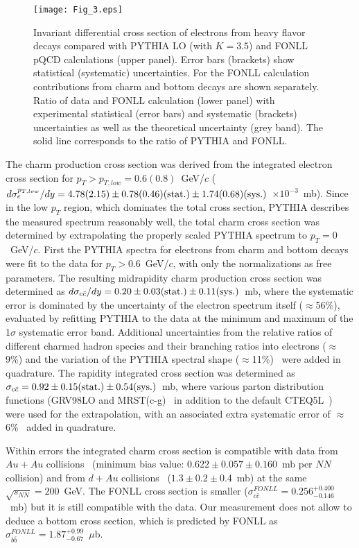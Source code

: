 \documentclass[aps,prl,superscriptaddress,showpacs,floatfix,twocolumn]{revtex4}
\begin{document}
\begin{figure}[t]
\texttt{[image: Fig\_3.eps]}
\caption {\label{fig:PPG037_Fig3} Invariant differential cross section of 
electrons from heavy flavor decays compared with PYTHIA LO (with $K = 3.5$) 
and FONLL pQCD calculations (upper panel). Error bars (brackets) show 
statistical (systematic) uncertainties. For the FONLL calculation contributions
from charm and bottom decays are shown separately. Ratio of data and FONLL
calculation (lower panel) with experimental statistical (error bars) and
systematic (brackets) uncertainties as well as the theoretical uncertainty
(grey band). The solid line corresponds to the ratio of PYTHIA and FONLL.}
\end{figure}

The charm production cross section was derived from the integrated electron
cross section for $p_{T} > p_{T,low} = 0.6 (0.8)$~GeV/$c$
($d\sigma_{e}^{p_{T,low}}/dy = 4.78 (2.15) \pm 0.78 (0.46) {\rm (stat.)} 
\pm 1.74 (0.68) {\rm (sys.)}$~$\times 10^{-3}$~mb).
Since in the low $p_T$ region, which dominates the total cross section, PYTHIA
describes the measured spectrum reasonably well, the total charm cross section 
was determined by extrapolating the properly scaled PYTHIA spectrum to 
$p_T = 0$~GeV/$c$. 
First the PYTHIA spectra for electrons from charm and bottom decays were fit 
to the data for $p_T > 0.6$~GeV/$c$, with only the normalizations as free 
parameters. 
The resulting midrapidity charm production cross section was determined as 
$d\sigma_{c\bar{c}}/dy = 0.20 \pm 0.03 {\rm (stat.)} \pm 0.11 {\rm (sys.)}$~mb,
where the systematic error is dominated by the uncertainty of the electron 
spectrum itself ($\approx$56\%), evaluated by refitting PYTHIA to the
data at the minimum and maximum of the 1$\sigma$ systematic error band. 
Additional uncertainties from the relative ratios of different charmed hadron 
species and their branching ratios into electrons ($\approx$9\%) and the 
variation of the PYTHIA spectral shape ($\approx$11\%)~\cite{phenix_auau200} 
were added in quadrature.
The rapidity integrated cross section was determined as
$\sigma_{c\bar{c}} = 0.92 \pm 0.15 {\rm (stat.)} \pm 0.54 {\rm (sys.)}$~mb,
where various parton distribution functions (GRV98LO and MRST(c-g)~\cite{pdf} 
in addition to the default CTEQ5L~\cite{cteq5l}) were used for the 
extrapolation, with an associated extra systematic error of 
$\approx$6\%~\cite{phenix_auau200} added in quadrature.

Within errors the integrated charm cross section is compatible with data from 
$Au + Au$ collisions~\cite{phenix_auau200} (minimum bias value: 
$0.622 \pm 0.057 \pm 0.160$~mb per $NN$ collision) and from $d + Au$ 
collisions~\cite{star_dau} ($1.3 \pm 0.2 \pm 0.4$~mb) at the same 
$\sqrt{s_{NN}} = 200$~GeV. 
The FONLL cross section is smaller 
($\sigma_{c\bar{c}}^{FONLL} = 0.256^{+0.400}_{-0.146}$~mb) but it is still 
compatible with the data. 
Our measurement does not allow to deduce a bottom cross section, which is 
predicted by FONLL as 
$\sigma_{b\bar{b}}^{FONLL} = 1.87^{+0.99}_{-0.67}$~$\mu$b.
\end{document}
